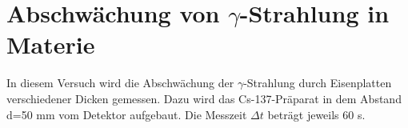\documentclass[../protokoll.tex]{subfiles}
\begin{document}
\section{Abschwächung von $\gamma$-Strahlung in Materie}\label{sec:Abschwächung Gamma-Strahlung}
In diesem Versuch wird die Abschwächung der $\gamma$-Strahlung durch Eisenplatten verschiedener Dicken gemessen. Dazu wird das Cs-137-Präparat in dem Abstand d=50 mm vom Detektor aufgebaut. Die Messzeit $\Delta t$ beträgt jeweils 60 s.
\end{document}
